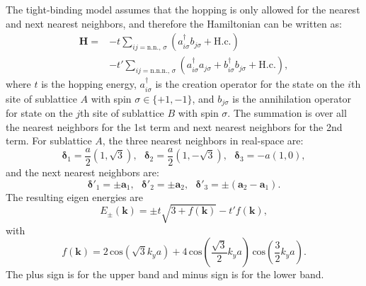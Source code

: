 \documentclass[pdflatex, sectionletters, 12pt]{pittetd}    %
\begin{document}
The tight-binding model assumes that the hopping is only allowed for the nearest and next nearest neighbors, and therefore the Hamiltonian can be written as\cite{wallace1947band, neto2009electronic}:
\begin{equation}
\begin{split}
\mathbf{H} = & - t \sum_{ij=\mathrm{n.n.}, \, \sigma} (a_{i\sigma}^{\dagger} b_{j\sigma} + \mathrm{H. c.}) \\
& - t' \sum_{ij=\mathrm{n.n.n.}, \, \sigma} (a_{i\sigma}^{\dagger} a_{j\sigma} + b_{i\sigma}^{\dagger} b_{j\sigma} + \mathrm{H. c.}),
\end{split}
\label{EQN:Hamiltonian}
\end{equation}
where $t$ is the hopping energy, $a_{i\sigma}^{\dagger}$ is the creation operator for the state on the $i$th site of sublattice $A$ with spin $\sigma\in\{+1, -1\}$, and $b_{j\sigma}$ is the annihilation operator for state on the $j$th site of sublattice $B$ with spin $\sigma$. The summation is over all the nearest neighbors for the 1st term and next nearest neighbors for the 2nd term. For sublattice $A$, the three nearest neighbors in real-space are: 
$$\mathbf{\delta}_1 = \frac{a}{2}\left(1, \sqrt{3}\right), \ \ \ \mathbf{\delta}_2 =  \frac{a}{2}\left(1, -\sqrt{3}\right), \ \ \ \mathbf{\delta}_3 = -a(1, 0),$$
and the next nearest neighbors are:
$$\mathbf{\delta}'_1 = \pm \mathbf{a}_1, \ \ \ \mathbf{\delta}'_2 =  \pm \mathbf{a}_2, \ \ \ \mathbf{\delta}'_3 = \pm (\mathbf{a}_2 - \mathbf{a}_1).$$
The resulting eigen energies are\cite{wallace1947band, neto2009electronic}
$$E_{\pm}(\mathbf{k}) = \pm t \sqrt{3 + f(\mathbf{k})} - t'f(\mathbf{k}),$$
with
$$f(\mathbf{k}) = 2 \, \mathrm{cos}\left( \sqrt{3} k_y a \right) + 4 \, \mathrm{cos}\left(\frac{\sqrt{3}}{2} k_y a \right) \, \mathrm{cos}\left( \frac{3}{2} k_y a \right).$$
The plus sign is for the upper band and minus sign is for the lower band. 
\end{document}
